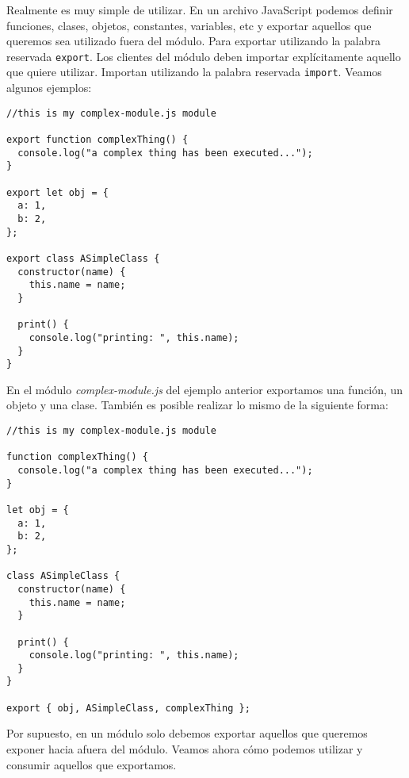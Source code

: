 \documentclass[a4paper, oneside, titlepage, 12pt]{paper}
\begin{document}
Realmente es muy simple de utilizar. En un archivo JavaScript podemos definir funciones, clases, objetos, constantes, variables, etc y exportar aquellos que queremos sea utilizado fuera del módulo. Para exportar utilizando la palabra reservada \texttt{export}. Los clientes del módulo deben importar explícitamente aquello que quiere utilizar. Importan utilizando la palabra reservada \texttt{import}. Veamos algunos ejemplos:
 
\begin{verbatim}
//this is my complex-module.js module

export function complexThing() {
  console.log("a complex thing has been executed...");
}

export let obj = {
  a: 1,
  b: 2,
};

export class ASimpleClass {
  constructor(name) {
    this.name = name;
  }

  print() {
    console.log("printing: ", this.name);
  }
}
\end{verbatim}

En el módulo \textit{complex-module.js} del ejemplo anterior exportamos una función, un objeto y una clase. También es posible realizar lo mismo de la siguiente forma:

\begin{verbatim}
//this is my complex-module.js module

function complexThing() {
  console.log("a complex thing has been executed...");
}

let obj = {
  a: 1,
  b: 2,
};

class ASimpleClass {
  constructor(name) {
    this.name = name;
  }

  print() {
    console.log("printing: ", this.name);
  }
}

export { obj, ASimpleClass, complexThing };
\end{verbatim}

Por supuesto, en un módulo solo debemos exportar aquellos que queremos exponer hacia afuera del módulo. Veamos ahora cómo podemos utilizar y consumir aquellos que exportamos.
\end{document}
